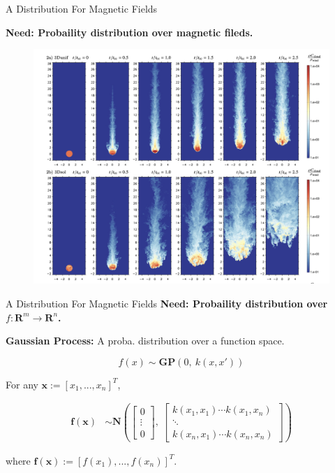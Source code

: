 \documentclass{beamer}
\begin{document}
\begin{frame}{A Distribution For Magnetic Fields}

  \textbf{Need: Probaility distribution over magnetic fileds.}

  \begin{figure}
    \includegraphics[width=0.85\linewidth]{plots/sample.png}
  \end{figure}

\end{frame}


\begin{frame}{A Distribution For Magnetic Fields}
  \textbf{Need: Probaility distribution over $f: \mathbf{R}^m \rightarrow \mathbf{R}^n$.}

  \textbf{Gaussian Process:} A proba. distribution over a function space.

  \begin{equation*}
    f(x) \sim \mathbf{GP}\left( 0,\ k(x, x')\right)
  \end{equation*}

  For any $\mathbf{x} := [x_1, ... , x_n]^T$,

  \begin{align*}
    \mathbf{f(x)} &\sim
    \mathbf{N}
    \left(
    \begin{bmatrix} 0 \\ \vdots \\ 0 \end{bmatrix}, \
    \begin{bmatrix}
      k(x_1, x_1) \cdots  k(x_1, x_n)\\
      \ddots \\
      k(x_n, x_1) \cdots  k(x_n, x_n)
    \end{bmatrix}
    \right)
  \end{align*}

  where $\mathbf{f(x)} := [f(x_1), ... , f(x_n)]^T$.

\end{frame}
\end{document}
